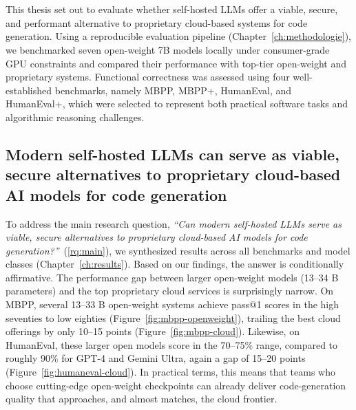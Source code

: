 
\chapter{}%
\label{ch:conclusie}


This thesis set out to evaluate whether self-hosted \glspl{LLM} offer a viable, secure, and performant alternative to proprietary cloud-based systems for code generation. Using a reproducible evaluation pipeline (Chapter~\ref{ch:methodologie}), we benchmarked seven open-weight 7B models locally under consumer-grade GPU constraints and compared their performance with top-tier open-weight and proprietary systems. Functional correctness was assessed using four well-established benchmarks, namely MBPP, MBPP+, HumanEval, and HumanEval+, which were selected to represent both practical software tasks and algorithmic reasoning challenges.

\section{Modern self-hosted LLMs can serve as viable, secure alternatives to proprietary cloud-based AI models for code generation}

To address the main research question, \textit{``Can modern self-hosted LLMs serve as viable, secure alternatives to proprietary cloud-based \gls{AI} models for code generation?''}~(\ref{rq:main}), we synthesized results across all benchmarks and model classes (Chapter~\ref{ch:results}). Based on our findings, the answer is conditionally affirmative. The performance gap between larger open-weight models (13--34 B parameters) and the top proprietary cloud services is surprisingly narrow. On MBPP, several 13--33 B open-weight systems achieve pass@1 scores in the high seventies to low eighties (Figure~\ref{fig:mbpp-openweight}), trailing the best cloud offerings by only 10--15 points (Figure~\ref{fig:mbpp-cloud}). Likewise, on HumanEval, these larger open models score in the 70--75\% range, compared to roughly 90\% for GPT-4 and Gemini Ultra, again a gap of 15--20 points (Figure~\ref{fig:humaneval-cloud}). In practical terms, this means that teams who choose cutting-edge open-weight checkpoints can already deliver code-generation quality that approaches, and almost matches, the cloud frontier.


